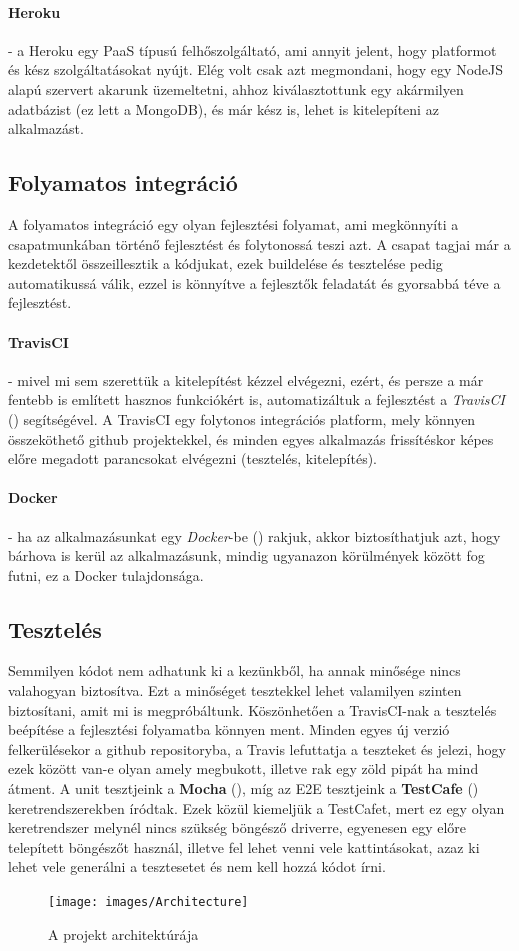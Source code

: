\paragraph{Heroku} - a Heroku egy PaaS típusú felhőszolgáltató, ami annyit jelent, hogy platformot és kész szolgáltatásokat nyújt. Elég volt csak azt megmondani, hogy egy NodeJS alapú szervert akarunk üzemeltetni, ahhoz kiválasztottunk egy akármilyen adatbázist (ez lett a MongoDB), és már kész is, lehet is kitelepíteni az alkalmazást.

\subsection{Folyamatos integráció}

A folyamatos integráció egy olyan fejlesztési folyamat, ami megkönnyíti a csapatmunkában történő fejlesztést és folytonossá teszi azt. A csapat tagjai már a kezdetektől összeillesztik a kódjukat, ezek buildelése és tesztelése pedig automatikussá válik, ezzel is könnyítve a fejlesztők feladatát és gyorsabbá téve a fejlesztést.

\paragraph{TravisCI} - mivel mi sem szerettük a kitelepítést kézzel elvégezni, ezért, és persze a már fentebb is említett hasznos funkciókért is, automatizáltuk a fejlesztést a \textit{TravisCI} (\cite{soft:travis}) segítségével. A TravisCI egy folytonos integrációs platform, mely könnyen összeköthető github projektekkel, és minden egyes alkalmazás frissítéskor képes előre megadott parancsokat elvégezni (tesztelés, kitelepítés).

\paragraph{Docker} - ha az alkalmazásunkat egy \textit{Docker}-be (\cite{soft:docker}) rakjuk, akkor biztosíthatjuk azt, hogy bárhova is kerül az alkalmazásunk, mindig ugyanazon körülmények között fog futni, ez a Docker tulajdonsága.

\subsection{Tesztelés}

Semmilyen kódot nem adhatunk ki a kezünkből, ha annak minősége nincs valahogyan biztosítva. Ezt a minőséget tesztekkel lehet valamilyen szinten biztosítani, amit mi is megpróbáltunk. Köszönhetően a TravisCI-nak a tesztelés beépítése a fejlesztési folyamatba könnyen ment. Minden egyes új verzió felkerülésekor a github repositoryba, a Travis lefuttatja a teszteket és jelezi, hogy ezek között van-e olyan amely megbukott, illetve rak egy zöld pipát ha mind átment. A unit tesztjeink a \textbf{Mocha} (\cite{soft:mocha}), míg az E2E tesztjeink a \textbf{TestCafe} (\cite{soft:testcafe}) keretrendszerekben íródtak. Ezek közül kiemeljük a TestCafet, mert ez egy olyan keretrendszer melynél nincs szükség böngésző driverre, egyenesen egy előre telepített böngészőt használ, illetve fel lehet venni vele kattintásokat, azaz ki lehet vele generálni a tesztesetet és nem kell hozzá kódot írni.

\begin{figure}[ht!]
	\centering
	\texttt{[image: images/Architecture]}
	\caption{A projekt architektúrája}
	\label{fig:Architecture}
\end{figure}
